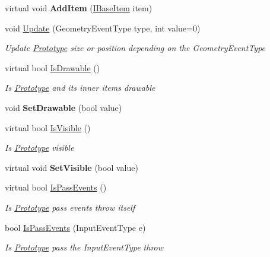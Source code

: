 \begin{DoxyCompactItemize}
virtual void {\bfseries Add\+Item} (\mbox{\hyperlink{interface_space_v_i_l_1_1_core_1_1_i_base_item}{I\+Base\+Item}} item)
\item 
void \mbox{\hyperlink{class_space_v_i_l_1_1_prototype_a04c59a65bf5d4b493b925fd86c69b5ff}{Update}} (Geometry\+Event\+Type type, int value=0)
\begin{DoxyCompactList}\small\item\em Update \mbox{\hyperlink{class_space_v_i_l_1_1_prototype}{Prototype}} size or position depending on the Geometry\+Event\+Type \end{DoxyCompactList}\item 
virtual bool \mbox{\hyperlink{class_space_v_i_l_1_1_prototype_a5e0af4f19ec991534e4cb5fdbe876af2}{Is\+Drawable}} ()
\begin{DoxyCompactList}\small\item\em Is \mbox{\hyperlink{class_space_v_i_l_1_1_prototype}{Prototype}} and its inner items drawable \end{DoxyCompactList}\item 
\mbox{\label{class_space_v_i_l_1_1_prototype_a0b002bebe29d3f014a5af100885c7f49}} 
void {\bfseries Set\+Drawable} (bool value)
\item 
virtual bool \mbox{\hyperlink{class_space_v_i_l_1_1_prototype_a852c3d3cd17417589ddb85c0cd99d26e}{Is\+Visible}} ()
\begin{DoxyCompactList}\small\item\em Is \mbox{\hyperlink{class_space_v_i_l_1_1_prototype}{Prototype}} visible \end{DoxyCompactList}\item 
\mbox{\label{class_space_v_i_l_1_1_prototype_accbd8c32a27fa17ade8b9348f58b1b5e}} 
virtual void {\bfseries Set\+Visible} (bool value)
\item 
virtual bool \mbox{\hyperlink{class_space_v_i_l_1_1_prototype_af78de74eef048beb5a5af4b36e0ba39e}{Is\+Pass\+Events}} ()
\begin{DoxyCompactList}\small\item\em Is \mbox{\hyperlink{class_space_v_i_l_1_1_prototype}{Prototype}} pass events throw itself \end{DoxyCompactList}\item 
bool \mbox{\hyperlink{class_space_v_i_l_1_1_prototype_a83b522f952145604406023cd2b3ffa10}{Is\+Pass\+Events}} (Input\+Event\+Type e)
\begin{DoxyCompactList}\small\item\em Is \mbox{\hyperlink{class_space_v_i_l_1_1_prototype}{Prototype}} pass the Input\+Event\+Type throw \end{DoxyCompactList}\item 

\end{DoxyCompactItemize}
